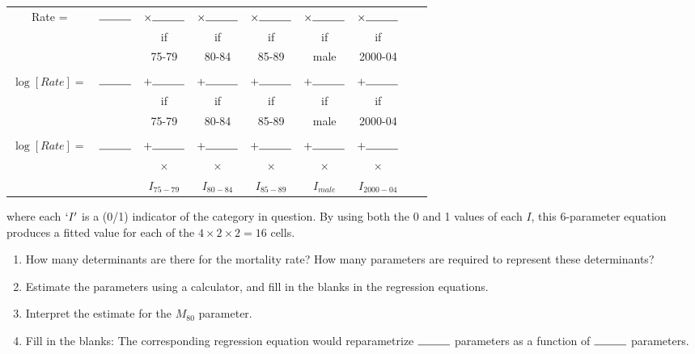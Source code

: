 \documentclass[landscape,twocolumn,letterpaper,9pt,reqno]{article}\usepackage[]{graphicx}\usepackage[]{color}
\newcommand{\compresslist}{ %
	\setlength{\itemsep}{1pt}
	\setlength{\parskip}{0pt}
	\setlength{\parsep}{0pt}
}
\begin{document}
\begin{tabular}{c c c c c c c c c}
	Rate = & $\rule{1cm}{0.15mm}$ & $\times \rule{1cm}{0.15mm}$ & $\times \rule{1cm}{0.15mm}$ & $\times \rule{1cm}{0.15mm}$ & $\times \rule{1cm}{0.15mm}$ & $\times \rule{1cm}{0.15mm}$ \\
	& &   if  &  if &  if & if & if & \\
	& &  75-79 & 80-84 & 85-89 & male & 2000-04 \\  \\
	$\log[Rate] =$ & $\rule{1cm}{0.15mm}$ & $+ \rule{1cm}{0.15mm}$ & $+ \rule{1cm}{0.15mm}$ & $+ \rule{1cm}{0.15mm}$ & $+ \rule{1cm}{0.15mm}$ & $+ \rule{1cm}{0.15mm}$ \\
	& &   if  &  if &  if & if & if & \\
	& &  75-79 & 80-84 & 85-89 & male & 2000-04 \\ \\
	
	$\log[Rate] =$ &$\rule{1cm}{0.15mm}$& $+  \rule{1cm}{0.15mm}$ & $+   \rule{1cm}{0.15mm}$ & $+   \rule{1cm}{0.15mm}$ & $+   \rule{1cm}{0.15mm} $ & $+ \rule{1cm}{0.15mm}$ \\
	& &  $\times$  &  $\times$ &  $\times$ & $\times$ & $\times$ & \\
	& &  $I_{75-79}$ & $I_{80-84}$ & $I_{85-89}$ & $I_{male}$ & $I_{2000-04}$ \\
\end{tabular}

where each $`I'$ is a (0/1) indicator of the category in question. By using both the 0 and 1 values of each $I$, this 6-parameter equation  produces a fitted value for each of the $4\times2\times2=16$ cells.



\begin{enumerate}\compresslist
	\item How many determinants are there for the mortality rate? How many parameters are required to represent these determinants?
	\item Estimate the parameters using a calculator, and fill in the blanks in the regression equations. 
	\item Interpret the estimate for the $M_{80}$ parameter.
	\item Fill in the blanks: The corresponding regression equation would reparametrize $\rule{1cm}{0.15mm}$ parameters as a function of $\rule{1cm}{0.15mm}$ parameters.
\end{enumerate}
\end{document}
